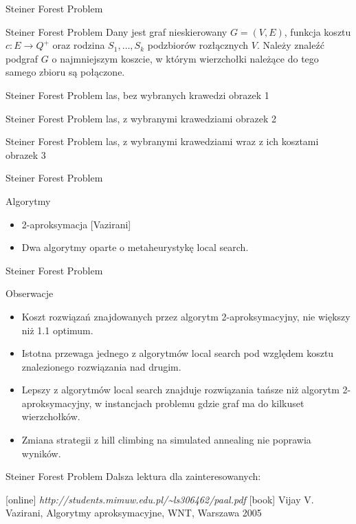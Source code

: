 \begin{frame}{Steiner Forest Problem}
\begin{block}{Steiner Forest Problem}
 Dany jest graf nieskierowany $G = (V, E)$, funkcja kosztu $c: E \rightarrow Q^+$ oraz rodzina $S_1, \hdots, S_k$ podzbiorów rozłącznych $V$. Należy znaleźć podgraf $G$ o najmniejszym koszcie, w którym wierzchołki należące do tego samego zbioru są połączone.
\end{block}
\end{frame}

\begin{frame}{Steiner Forest Problem}
las, bez wybranych krawedzi
obrazek 1
\end{frame}

\begin{frame}{Steiner Forest Problem}
las, z wybranymi krawedziami
obrazek 2
\end{frame}

\begin{frame}{Steiner Forest Problem}
las, z wybranymi krawedziami wraz z ich kosztami
obrazek 3
\end{frame}

\begin{frame}{Steiner Forest Problem}
\begin{block}{Algorytmy}
\begin{itemize}
\item 2-aproksymacja [Vazirani]
\item Dwa algorytmy oparte o metaheurystykę local search.
\end{itemize}
\end{block}
\end{frame}

\begin{frame}{Steiner Forest Problem}
\begin{block}{Obserwacje}
\begin{itemize}
\item Koszt rozwiązań znajdowanych przez algorytm 2-aproksymacyjny, nie większy niż 1.1 optimum.
\item Istotna przewaga jednego z algorytmów local search pod względem kosztu znalezionego rozwiązania nad drugim.
\item Lepszy z algorytmów local search znajduje rozwiązania tańsze niż algorytm 2-aproksymacyjny, w instancjach problemu gdzie graf ma do kilkuset wierzchołków.
\item Zmiana strategii z hill climbing na simulated annealing nie poprawia wyników.
\end{itemize}
\end{block}
\end{frame}

\begin{frame}{Steiner Forest Problem}
Dalsza lektura dla zainteresowanych:
\begin{thebibliography}{9}
[online]
 {\em http://students.mimuw.edu.pl/\textasciitilde ls306462/paal.pdf}
[book]
 Vijay V. Vazirani, Algorytmy aproksymacyjne, WNT, Warszawa 2005
\end{thebibliography}
\end{frame}
